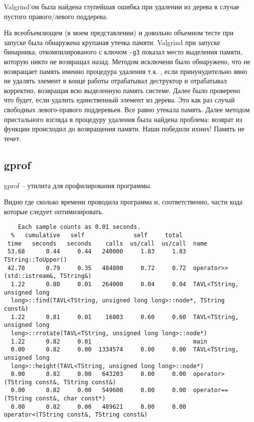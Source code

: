 \documentclass[12pt]{article}
\begin{document}
Valgrind'ом была найдена глупейшая ошибка при удалении из дерева в случае пустого правого/левого поддерева.

На всеобъемлющем (в моем представлении) и довольно объемном тесте при запуске была обнаружена крупаная утечка памяти. Valgrind при запуске бинарника, откомпилированого с ключом \verb|-g3| показал место выделения памяти, которую никто не возвращал назад.
Методом исключени было обнаружено, что не возвращает память именно процедура удаления т.к. , если принунудительно явно не удалять элемент в конце работы отрабатывал деструктор и отрабатывал корректно, возвращая всю выделенную память системе. Далее было проверено что будет, если удалить единственный элемент из дерева. Это как раз случай свободных левого-правого поддеревьев. Все равно утекала память. Далее методом пристального взгляда в процедуру удаления была найдена проблема: возврат из функции происходил до возвращения памяти. Наши победили ихних! Память не течет.

\subsection*{gprof}

gprof -- утилита для профилирования программы.

Видно где сколько времени проводила программа и, соответственно, части кода которые следует оптимизировать.
\begin{small}
\footnotesize
\begin{verbatim}
    Each sample counts as 0.01 seconds.
  %   cumulative   self              self     total           
 time   seconds   seconds    calls  us/call  us/call  name    
 53.68      0.44     0.44   240000     1.83     1.83  TString::ToUpper()
 42.70      0.79     0.35   484800     0.72     0.72  operator>>(std::istream&, TString&)
  1.22      0.80     0.01   264000     0.04     0.04  TAVL<TString, unsigned long
  long>::find(TAVL<TString, unsigned long long>::node*, TString const&)
  1.22      0.81     0.01    16803     0.60     0.60  TAVL<TString, unsigned long
  long>::rrotate(TAVL<TString, unsigned long long>::node*)
  1.22      0.82     0.01                             main
  0.00      0.82     0.00  1334574     0.00     0.00  TAVL<TString, unsigned long
  long>::height(TAVL<TString, unsigned long long>::node*)
  0.00      0.82     0.00   643203     0.00     0.00  operator>(TString const&, TString const&)
  0.00      0.82     0.00   549600     0.00     0.00  operator==(TString const&, char const*)
  0.00      0.82     0.00   489621     0.00     0.00  operator<(TString const&, TString const&)
\end{verbatim}
\end{small}
\end{document}
